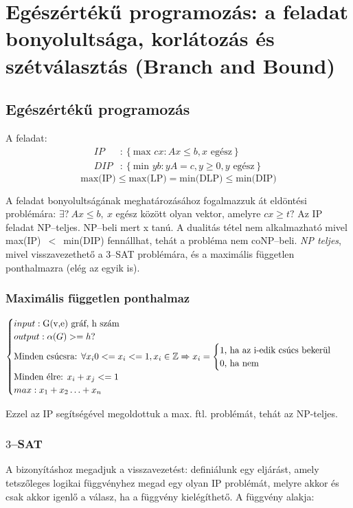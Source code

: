\skiptooddpage
\section[Egészértékű programozás]{Egészértékű programozás: a feladat bonyolultsága, korlátozás és szétválasztás (Branch and Bound)}

\subsection{Egészértékű programozás}
A feladat:
\begin{align*}
IP &: \left\{\mbox{max }{cx: Ax \leq b, x \mbox{ egész}}\right\} \\
DIP &: \left\{ \mbox{min }{yb: yA=c, y \geq 0, y \mbox{ egész}}\right\}
\end{align*}
\[ \mbox{max(IP)} \leq \mbox{max(LP)}= \mbox{min(DLP)} \leq \mbox{min(DIP)} \]

A feladat bonyolultságának meghatározásához fogalmazzuk át eldöntési problémára:
$\exists?~Ax \leq b,~ x$ egész között olyan vektor, amelyre $cx \geq t?$ Az IP
feladat NP--teljes. NP--beli mert x tanú. A dualitás tétel nem alkalmazható
mivel max(IP)~$<$~min(DIP) fennállhat, tehát a probléma nem coNP--beli.
\emph{NP teljes}, mivel visszavezethető a $3$--SAT problémára, és a maximális
független ponthalmazra (elég az egyik is).

\subsubsection{Maximális független ponthalmaz}

$ \begin{cases}
input: \mbox{G(v,e) gráf, h szám} \\
output: \alpha (G) >= h? \\
	\mbox{Minden csúcsra: }
	\forall x_i 0 <= x_i <= 1, x_i \in \mathbb{Z}
	\xRightarrow{}
	x_i = \begin{cases}
		\mbox{1, ha az i-edik csúcs bekerül} \\
		\mbox{0, ha nem}
	\end{cases} \\
\mbox{Minden élre: }
x_i + x_j <= 1 \\
max: x_1 + x_2 \ldots + x_n
\end{cases}$

Ezzel az IP segítségével megoldottuk a max. ftl. problémát, tehát az NP-teljes.

\subsubsection{$3$--SAT}
A bizonyításhoz megadjuk a visszavezetést: definiálunk egy eljárást, amely tetszőleges
logikai függvényhez megad egy olyan IP problémát, melyre akkor és csak akkor igenlő a
válasz, ha a függvény kielégíthető. A függvény alakja:

